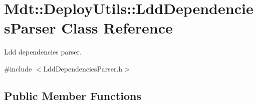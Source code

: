 \hypertarget{class_mdt_1_1_deploy_utils_1_1_ldd_dependencies_parser}{}\section{Mdt\+:\+:Deploy\+Utils\+:\+:Ldd\+Dependencies\+Parser Class Reference}
\label{class_mdt_1_1_deploy_utils_1_1_ldd_dependencies_parser}


Ldd dependencies parser.  




{\ttfamily \#include $<$Ldd\+Dependencies\+Parser.\+h$>$}

\subsection*{Public Member Functions}
